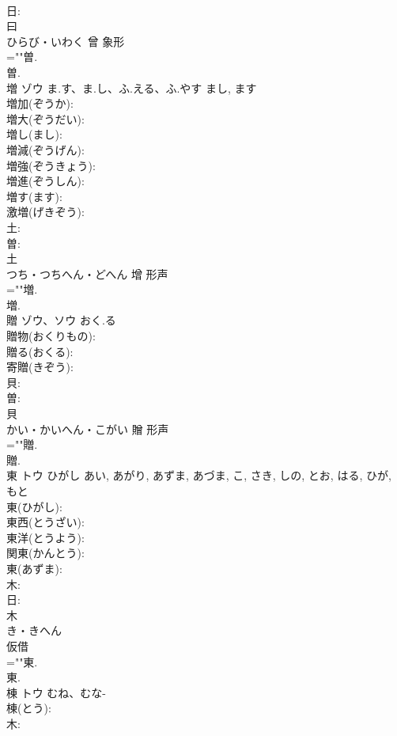 \documentclass[8pt]{extreport}
\begin{document}
\begin{CJK}{UTF8}{min}
\\	日: 
\\	曰	
\\	ひらび・いわく	曾	象形 
\\	=""曽.
\\	曽.
\\	増	ゾウ	ま.す、ま.し、ふ.える、ふ.やす	まし, ます	
\\	増加(ぞうか): 
\\	増大(ぞうだい): 
\\	増し(まし): 
\\	増減(ぞうげん): 
\\	増強(ぞうきょう): 
\\	増進(ぞうしん): 
\\	増す(ます): 
\\	激増(げきぞう): 
\\	土: 
\\	曽: 
\\	土	
\\	つち・つちへん・どへん	增	形声 
\\	=""増.
\\	増.
\\	贈	ゾウ、ソウ	おく.る		
\\	贈物(おくりもの): 
\\	贈る(おくる): 
\\	寄贈(きぞう): 
\\	貝: 
\\	曽: 
\\	貝	
\\	かい・かいへん・こがい	贈	形声 
\\	=""贈.
\\	贈.
\\	東	トウ	ひがし	あい, あがり, あずま, あづま, こ, さき, しの, とお, はる, ひが, もと	
\\	東(ひがし): 
\\	東西(とうざい): 
\\	東洋(とうよう): 
\\	関東(かんとう): 
\\	東(あずま): 
\\	木: 
\\	日: 
\\	木	
\\	き・きへん	
\\	仮借 
\\	=""東.
\\	東.
\\	棟	トウ	むね、むな-		
\\	棟(とう): 
\\	木: 

\end{CJK}
\end{document}
